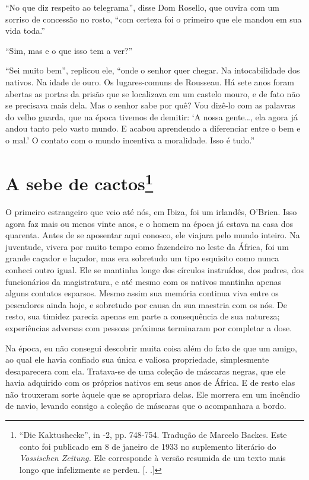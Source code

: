 ``No que diz respeito ao telegrama'', disse Dom Rosello, que ouvira com
um sorriso de concessão no rosto, ``com certeza foi o primeiro que ele
mandou em sua vida toda.''

``Sim, mas e o que isso tem a ver?''

``Sei muito bem'', replicou ele, ``onde o senhor quer chegar. Na
intocabilidade dos nativos. Na idade de ouro. Os lugares-comuns de
Rousseau. Há sete anos foram abertas as portas da prisão que se
localizava em um castelo mouro, e de fato não se precisava mais dela.
Mas o senhor sabe por quê? Vou dizê-lo com as palavras do velho guarda,
que na época tivemos de demitir: `A nossa gente\ldots{}, ela agora já
andou tanto pelo vasto mundo. E acabou aprendendo a diferenciar entre o
bem e o mal.' O contato com o mundo incentiva a moralidade. Isso é
tudo.''

\chapter{A sebe de cactos\footnote[*]{``Die Kaktushecke'', in  -2, pp. 748-754.
  Tradução de Marcelo Backes. Este conto foi publicado em 8 de janeiro
  de 1933 no suplemento literário do \emph{Vossischen Zeitung.} Ele
  corresponde à versão resumida de um texto mais longo que infelizmente
  se perdeu. [. .]} }

O primeiro estrangeiro que veio até nós, em Ibiza, foi um irlandês,
O'Brien. Isso agora faz mais ou menos vinte anos, e o homem na época já
estava na casa dos quarenta. Antes de se aposentar aqui conosco, ele
viajara pelo mundo inteiro. Na juventude, vivera por muito tempo como
fazendeiro no leste da África, foi um grande caçador e laçador, mas era
sobretudo um tipo esquisito como nunca conheci outro igual. Ele se
mantinha longe dos círculos instruídos, dos padres, dos funcionários da
magistratura, e até mesmo com os nativos mantinha apenas alguns contatos
esparsos. Mesmo assim sua memória continua viva entre os pescadores
ainda hoje, e sobretudo por causa da sua maestria com os nós. De resto,
sua timidez parecia apenas em parte a consequência de sua natureza;
experiências adversas com pessoas próximas terminaram por completar a
dose.

Na época, eu não consegui descobrir muita coisa além do fato de que um
amigo, ao qual ele havia confiado sua única e valiosa propriedade,
simplesmente desaparecera com ela. Tratava-se de uma coleção de máscaras
negras, que ele havia adquirido com os próprios nativos em seus anos de
África. E de resto elas não trouxeram sorte àquele que se apropriara
delas. Ele morrera em um incêndio de navio, levando consigo a coleção de
máscaras que o acompanhara a bordo.

